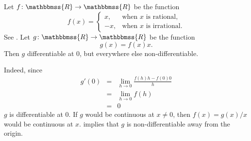 \documentclass[12pt]{article}
\newcommand{\R}{\mathbbmss{R}}
\begin{document}
Let $f\colon \R\to \R$ be the function 
$$
f(x) = \begin{cases} x, & \mbox{when $x$ is rational}, \\
-x, & \mbox{when $x$ is irrational}.
\end{cases}
$$
See .
Let $g\colon \R\to \R$ be the function
$$ 
  g(x) = f(x) x.
$$
Then $g$ differentiable at $0$,
but everywhere else non-differentiable.

Indeed, since
\begin{eqnarray*}
  g'(0) &=& \lim_{h\to 0} \frac{f(h)h-f(0)0}{h} \\
        &=& \lim_{h\to 0} f(h) \\
        &=& 0
\end{eqnarray*}
$g$ is differentiable at $0$. 
If $g$ would be continuous at $x\neq 0$, then $f(x)=g(x)/x$ 
would be continuous at $x$. 
implies that $g$ is non-differentiable away from the origin.
\end{document}
